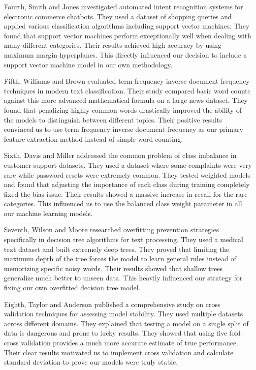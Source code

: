 \documentclass[12pt]{article}
\begin{document}
Fourth, Smith and Jones investigated automated intent recognition systems for electronic commerce chatbots. They used a dataset of shopping queries and applied various classification algorithms including support vector machines. They found that support vector machines perform exceptionally well when dealing with many different categories. Their results achieved high accuracy by using maximum margin hyperplanes. This directly influenced our decision to include a support vector machine model in our own methodology.

Fifth, Williams and Brown evaluated term frequency inverse document frequency techniques in modern text classification. Their study compared basic word counts against this more advanced mathematical formula on a large news dataset. They found that penalizing highly common words drastically improved the ability of the models to distinguish between different topics. Their positive results convinced us to use term frequency inverse document frequency as our primary feature extraction method instead of simple word counting.

Sixth, Davis and Miller addressed the common problem of class imbalance in customer support datasets. They used a dataset where some complaints were very rare while password resets were extremely common. They tested weighted models and found that adjusting the importance of each class during training completely fixed the bias issue. Their results showed a massive increase in recall for the rare categories. This influenced us to use the balanced class weight parameter in all our machine learning models.

Seventh, Wilson and Moore researched overfitting prevention strategies specifically in decision tree algorithms for text processing. They used a medical text dataset and built extremely deep trees. They proved that limiting the maximum depth of the tree forces the model to learn general rules instead of memorizing specific noisy words. Their results showed that shallow trees generalize much better to unseen data. This heavily influenced our strategy for fixing our own overfitted decision tree model.

Eighth, Taylor and Anderson published a comprehensive study on cross validation techniques for assessing model stability. They used multiple datasets across different domains. They explained that testing a model on a single split of data is dangerous and prone to lucky results. They showed that using five fold cross validation provides a much more accurate estimate of true performance. Their clear results motivated us to implement cross validation and calculate standard deviation to prove our models were truly stable.
\end{document}
